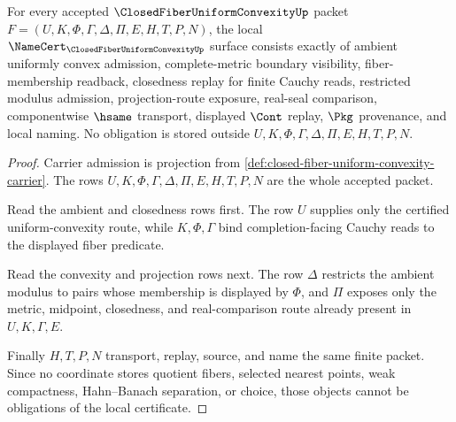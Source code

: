 \begin{theorem}
\label{thm:closed-fiber-uniform-convexity-namecert-obligations}
For every accepted $\ClosedFiberUniformConvexityUp$ packet $F=(U,K,\Phi,\Gamma,\Delta,\Pi,E,H,T,P,N)$, the local $\NameCert_{\ClosedFiberUniformConvexityUp}$ surface consists exactly of ambient uniformly convex admission, complete-metric boundary visibility, fiber-membership readback, closedness replay for finite Cauchy reads, restricted modulus admission, projection-route exposure, real-seal comparison, componentwise $\hsame$ transport, displayed $\Cont$ replay, $\Pkg$ provenance, and local naming. No obligation is stored outside $U,K,\Phi,\Gamma,\Delta,\Pi,E,H,T,P,N$.
\end{theorem}
\begin{proof}
Carrier admission is projection from \autoref{def:closed-fiber-uniform-convexity-carrier}. The rows $U,K,\Phi,\Gamma,\Delta,\Pi,E,H,T,P,N$ are the whole accepted packet.

Read the ambient and closedness rows first. The row $U$ supplies only the certified uniform-convexity route, while $K,\Phi,\Gamma$ bind completion-facing Cauchy reads to the displayed fiber predicate.

Read the convexity and projection rows next. The row $\Delta$ restricts the ambient modulus to pairs whose membership is displayed by $\Phi$, and $\Pi$ exposes only the metric, midpoint, closedness, and real-comparison route already present in $U,K,\Gamma,E$.

Finally $H,T,P,N$ transport, replay, source, and name the same finite packet. Since no coordinate stores quotient fibers, selected nearest points, weak compactness, Hahn--Banach separation, or choice, those objects cannot be obligations of the local certificate.
\end{proof}

